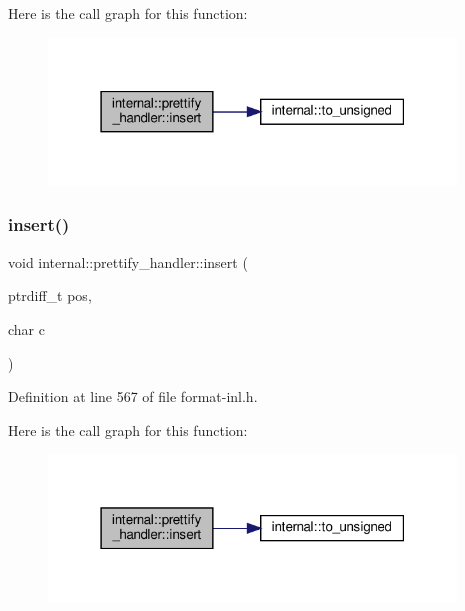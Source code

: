 Here is the call graph for this function\+:
\nopagebreak
\begin{figure}[H]
\begin{center}
\leavevmode
\includegraphics[width=307pt]{structinternal_1_1prettify__handler_aefa1e7bbf120e18221a97a51c6b2048a_cgraph}
\end{center}
\end{figure}
\mbox{\label{structinternal_1_1prettify__handler_a528be8c2e3d695004441af781d114bb3}} 
\subsubsection{\texorpdfstring{insert()}{insert()}\hspace{0.1cm}{\footnotesize\ttfamily [2/2]}}
{\footnotesize\ttfamily void internal\+::prettify\+\_\+handler\+::insert (\begin{DoxyParamCaption}\item[{ptrdiff\+\_\+t}]{pos,  }\item[{char}]{c }\end{DoxyParamCaption})\hspace{0.3cm}{\ttfamily [inline]}}



Definition at line 567 of file format-\/inl.\+h.

Here is the call graph for this function\+:
\nopagebreak
\begin{figure}[H]
\begin{center}
\leavevmode
\includegraphics[width=307pt]{structinternal_1_1prettify__handler_a528be8c2e3d695004441af781d114bb3_cgraph}
\end{center}
\end{figure}
\mbox{\label{structinternal_1_1prettify__handler_a0e352c9e5a3e75877a6a62d0ddbe4201}} 
